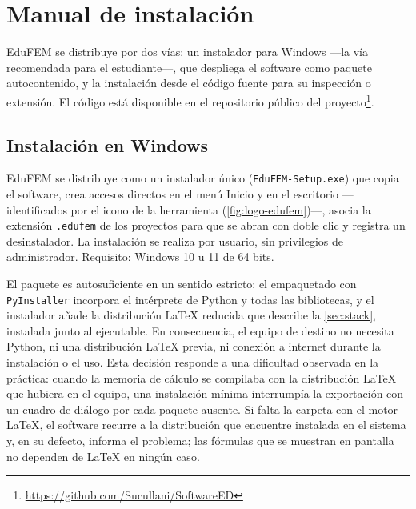 
\chapter{Manual de instalación}
\label{anexo:instalacion}

EduFEM se distribuye por dos vías: un instalador para Windows —la vía recomendada para el estudiante—, que despliega el software como paquete autocontenido, y la instalación desde el código fuente para su inspección o extensión. El código está disponible en el repositorio público del proyecto\footnote{\url{https://github.com/Sucullani/SoftwareED}}.

\section{Instalación en Windows}

EduFEM se distribuye como un instalador único (\texttt{EduFEM-Setup.exe}) que copia el software, crea accesos directos en el menú Inicio y en el escritorio —identificados por el icono de la herramienta (\autoref{fig:logo-edufem})—, asocia la extensión \texttt{.edufem} de los proyectos para que se abran con doble clic y registra un desinstalador. La instalación se realiza por usuario, sin privilegios de administrador. Requisito: Windows 10 u 11 de 64 bits.

El paquete es autosuficiente en un sentido estricto: el empaquetado con \texttt{PyInstaller} incorpora el intérprete de Python y todas las bibliotecas, y el instalador añade la distribución \LaTeX{} reducida que describe la \autoref{sec:stack}, instalada junto al ejecutable. En consecuencia, el equipo de destino no necesita Python, ni una distribución \LaTeX{} previa, ni conexión a internet durante la instalación o el uso. Esta decisión responde a una dificultad observada en la práctica: cuando la memoria de cálculo se compilaba con la distribución \LaTeX{} que hubiera en el equipo, una instalación mínima interrumpía la exportación con un cuadro de diálogo por cada paquete ausente. Si falta la carpeta con el motor \LaTeX{}, el software recurre a la distribución que encuentre instalada en el sistema y, en su defecto, informa el problema; las fórmulas que se muestran en pantalla no dependen de \LaTeX{} en ningún caso.

